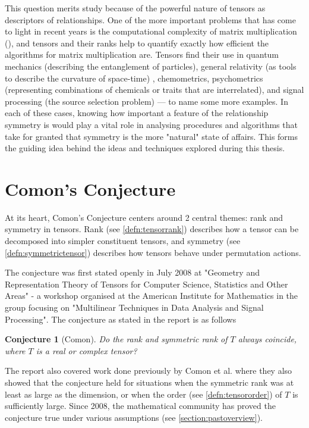 \documentclass[12pt,a4paper,oneside]{book}
\newtheorem{conjecture}{Conjecture}
\theoremstyle{definition}
\begin{document}
This question merits study because of the powerful nature of tensors as descriptors of relationships. One of the more important problems that has come to light in recent years is the computational complexity of matrix multiplication (\cite{landsberg_tensors_2012}), and tensors and their ranks help to quantify exactly how efficient the algorithms for matrix multiplication are. Tensors find their use in quantum mechanics (describing the entanglement of particles), general relativity (as tools to describe the curvature of space-time) \cite{carroll_spacetime_2019}, chemometrics, psychometrics (representing combinations of chemicals or traits that are interrelated)\cite{zhang_comons_2016}, and signal processing (the source selection problem)\cite{landsberg_tensors_2012} --- to name some more examples. In each of these cases, knowing how important a feature of the relationship symmetry is would play a vital role in analysing procedures and algorithms that take for granted that symmetry is the more "natural" state of affairs. This forms the guiding idea behind the ideas and techniques explored during this thesis.

\section*{Comon's Conjecture}\label{section:comonsconjecture}
At its heart, Comon's Conjecture centers around 2 central themes: rank and symmetry in tensors. Rank (see \cref{defn:tensorrank}) describes how a tensor can be decomposed into simpler constituent tensors, and symmetry (see \cref{defn:symmetrictensor}) describes how tensors behave under permutation actions.

The conjecture was first stated openly in July 2008 at "Geometry and Representation Theory of Tensors for Computer Science, Statistics and Other Areas" - a workshop organised at the American Institute for Mathematics \cite{oeding_report_2008} in the group focusing on "Multilinear Techniques in Data Analysis and Signal Processing". The conjecture as stated in the report is as follows

\begin{conjecture}[Comon]
    Do the rank and symmetric rank of $T$ always coincide, where $T$ is a real or complex tensor?
\end{conjecture}

The report also covered work done previously by Comon et al. \cite{comon_symmetric_2008} where they also showed that the conjecture held for situations when the symmetric rank was at least as large as the dimension, or when the order (see \cref{defn:tensororder}) of $T$ is sufficiently large. Since 2008, the mathematical community has proved the conjecture true under various assumptions (see \cref{section:pastoverview}). 
\end{document}
